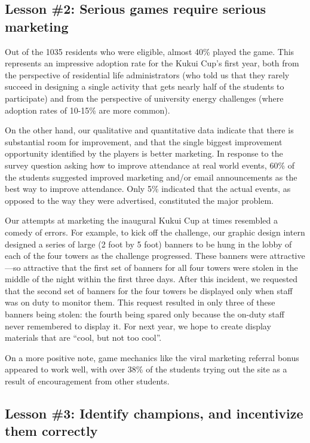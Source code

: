 \documentclass{acm_proc_article-sp}
\begin{document}
\subsection{Lesson \#2: Serious games require serious marketing}

Out of the 1035 residents who were eligible, almost 40\% played the
game. This represents an impressive adoption rate for the Kukui Cup's first
year, both from the perspective of residential life administrators (who
told us that they rarely succeed in designing a single activity that gets
nearly half of the students to participate) and from the perspective of
university energy challenges (where adoption rates of 10-15\% are more
common).

On the other hand, our qualitative and quantitative data indicate that
there is substantial room for improvement, and that the single biggest
improvement opportunity identified by the players is better marketing.  In
response to the survey question asking how to improve attendance at real
world events, 60\% of the students suggested improved marketing and/or email
announcements as the best way to improve attendance.  Only 5\% indicated
that the actual events, as opposed to the way they were advertised,
constituted the major problem.

Our attempts at marketing the inaugural Kukui Cup at times resembled a comedy
of errors. For example, to kick off the challenge, our graphic design intern
designed a series of large (2 foot by 5 foot) banners to be hung in the lobby
of each of the four towers as the challenge progressed. These banners were
attractive---so attractive that the first set of banners for all four towers
were stolen in the middle of the night within the first three days. After this
incident, we requested that the second set of banners for the four towers be
displayed only when staff was on duty to monitor them.  This request resulted
in only three of these banners being stolen: the fourth being
spared only because the on-duty staff never remembered to display it.  For next
year, we hope to create display materials that are ``cool, but not too cool''.

On a more positive note, game mechanics like the viral marketing referral bonus
appeared to work well, with over 38\% of the students trying out the site as a
result of encouragement from other students.

\subsection{Lesson \#3: Identify champions, and incentivize them correctly}
\end{document}
